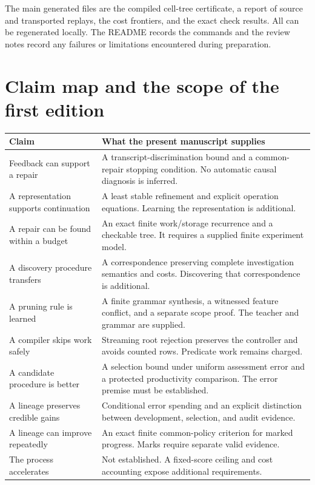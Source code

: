 \documentclass[11pt,oneside,openany]{book}
\numberwithin{equation}{section}
\begin{document}
The main generated files are the compiled cell-tree certificate, a report of source and transported replays, the cost frontiers, and the exact check results. All can be regenerated locally. The README records the commands and the review notes record any failures or limitations encountered during preparation.

\section{Claim map and the scope of the first edition}\label{SII:app:claimmap}
\begin{small}\begin{longtable}{@{}p{}p{}@{}}\toprule
Claim & What the present manuscript supplies\\\midrule\endhead
Feedback can support a repair & A transcript-discrimination bound and a common-repair stopping condition. No automatic causal diagnosis is inferred.\\
A representation supports continuation & A least stable refinement and explicit operation equations. Learning the representation is additional.\\
A repair can be found within a budget & An exact finite work/storage recurrence and a checkable tree. It requires a supplied finite experiment model.\\
A discovery procedure transfers & A correspondence preserving complete investigation semantics and costs. Discovering that correspondence is additional.\\
A pruning rule is learned & A finite grammar synthesis, a witnessed feature conflict, and a separate scope proof. The teacher and grammar are supplied.\\
A compiler skips work safely & Streaming root rejection preserves the controller and avoids counted rows. Predicate work remains charged.\\
A candidate procedure is better & A selection bound under uniform assessment error and a protected productivity comparison. The error premise must be established.\\
A lineage preserves credible gains & Conditional error spending and an explicit distinction between development, selection, and audit evidence.\\
A lineage can improve repeatedly & An exact finite common-policy criterion for marked progress. Marks require separate valid evidence.\\
The process accelerates & Not established. A fixed-score ceiling and cost accounting expose additional requirements.\\

\end{longtable}
\end{small}
\end{document}
